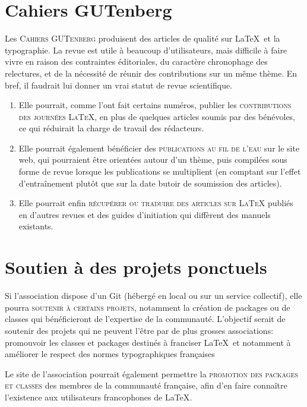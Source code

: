 \documentclass{tufte-handout}
\newcommand{\ratio}[3][]{\marginpar{\footnotesize{\textcolor{teal}{Temps requis: #2 / Utilité: #3}\par\noindent \textcolor{teal}{#1}}}}
\begin{document}
\section{Cahiers GUTenberg}

Les \textsc{Cahiers GUTenberg}\ratio[Chronophage, mais utile à la communauté et susceptible de bénéficier des autres projets]{++}{+++} produisent des articles de qualité sur \LaTeX\ et la typographie. La revue est utile à beaucoup d'utilisateurs, mais difficile à faire vivre en raison des contraintes éditoriales, du caractère chronophage des relectures, et de la nécessité de réunir des contributions sur un même thème. En bref, il faudrait lui donner un vrai statut de revue scientifique.

\begin{enumerate}
	\item Elle pourrait, comme l'ont fait certains numéros, publier les \textsc{contributions des journées \LaTeX}, en plus de quelques articles soumis par des bénévoles, ce qui réduirait la charge de travail des rédacteurs.
	\item Elle pourrait également bénéficier des \textsc{publications au fil de l'eau} sur le site web, qui pourraient être orientées autour d'un thème, puis compilées sous forme de revue lorsque les publications se multiplient (en comptant sur l'effet d'entraînement plutôt que sur la date butoir de soumission des articles).
	\item Elle pourrait enfin \textsc{récupérer ou traduire des articles sur \LaTeX} publiés en d'autres revues et des guides d'initiation qui diffèrent des manuels existants.
\end{enumerate}


\section{Soutien à des projets ponctuels}

Si l'association dispose d'un Git\ratio[Sur la base du bénévolat uniquement]{+}{++} (hébergé en local ou sur un service collectif), elle pourra \textsc{soutenir à certains projets}, notamment la création de packages ou de classes qui bénéficieront de l'expertise de la communauté. L'objectif serait de soutenir des projets qui ne peuvent l'être par de plus grosses associations: promouvoir les classes et packages destinés à franciser \LaTeX\, et notamment à améliorer le respect des normes typographiques françaises

Le site de l'association\ratio[Simple mise à jour du site]{+}{+++} pourrait également permettre la \textsc{promotion des packages et classes} des membres de la communauté française, afin d'en faire connaître l'existence aux utilisateurs francophones de \LaTeX.
\end{document}

